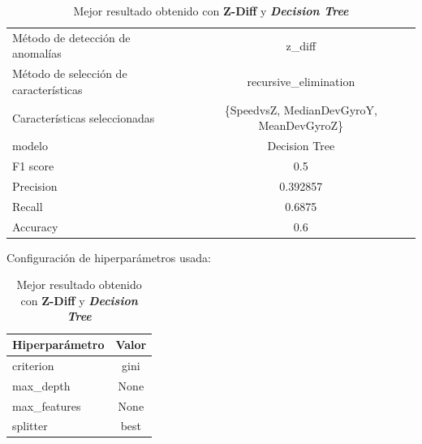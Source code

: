 \begin{appendices}
		\begin{table}[htb]
			\centering
			\caption{Mejor resultado obtenido con \textbf{Z-Diff} y \textbf{\emph{Decision Tree}}}
			\label{table:22}
			\begin{tabular}{lc}
				\toprule
				\midrule
					  Método de detección de anomalías &                                   z\_diff \\
				Método de selección de características &                    recursive\_elimination \\
						 Características seleccionadas & \{SpeedvsZ, MedianDevGyroY, MeanDevGyroZ\}\\
												modelo &                            Decision Tree \\
											  F1 score &                                      0.5 \\
											 Precision &                                 0.392857 \\
												Recall &                                   0.6875 \\
											  Accuracy &                                      0.6 \\
				\bottomrule
				\end{tabular}
			\newline
			\newline
			Configuración de hiperparámetros usada:
			\begin{tabular}{lc}
				\toprule
				Hiperparámetro & Valor \\
				\midrule
					 criterion &  gini \\
					 max\_depth &  None \\
				  max\_features &  None \\
					  splitter &  best \\
				\bottomrule
			\end{tabular}
			
		\end{table}


\end{appendices}
